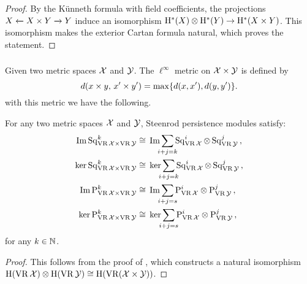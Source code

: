 \begin{proof}
	By the K\"unneth formula with field coefficients, the projections $X \xleftarrow{} X \times Y \xrightarrow{} Y$ induce an isomorphism $\mathrm{H}^*(X) \otimes \mathrm{H}^*(Y) \to \mathrm{H}^*(X \times Y)$.
	This isomorphism makes the exterior Cartan formula natural, which proves the statement.
\end{proof}

\subsubsection{}

Given two metric spaces $\mathcal{X}$ and $\mathcal{Y}$.
The $\ell^\infty$ metric on $\mathcal{X} \times \mathcal{Y}$ is defined by
\[
d(x \times y, \, x' \times y') = \max\{d(x,x'), d(y,y')\}.
\]
with this metric we have the following.

\medskip\corollary
For any two metric spaces $\mathcal{X}$ and $\mathcal{Y}$,
Steenrod persistence modules satisfy:
\begin{align*}
	\img\Sq^k_{\VR\cX \times \VR\cY} &\cong\, \img\sum_{\mathclap{i+j=k}} \Sq^i_{\VR\cX} \ot \Sq^j_{\VR\cY}\,, \\ \ker\Sq^k_{\VR\cX \times \VR\cY} &\cong\, \ker\sum_{\mathclap{i+j=k}} \Sq^i_{\VR\cX} \ot \Sq^j_{\VR\cY}\,, \\
	\img\rP^k_{\VR\cX \times \VR\cY} &\cong\, \img\sum_{\mathclap{i+j=s}} \rP^i_{\VR\cX} \otimes \rP^j_{\VR\cY}\,, \\ 
	\ker\rP^k_{\VR\cX \times \VR\cY} &\cong\, \ker\sum_{\mathclap{i+j=s}} \rP^i_{\VR\cX} \otimes \rP^j_{\VR\cY}\,,
\end{align*}
for any $k \in \mathbb{N}$.

\begin{proof}
	This follows from the proof of \cite[Theorem~6.1(1)]{lim2020vietoris}, which constructs a natural isomorphism $\mathrm{H}(\operatorname{VR}\mathcal{X}) \otimes \mathrm{H}(\operatorname{VR}\mathcal{Y}) \cong \mathrm{H}(\operatorname{VR}(\mathcal{X} \times \mathcal{Y}))$.
\end{proof}